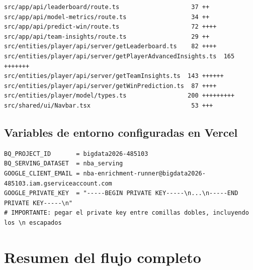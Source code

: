 \documentclass[12pt, letterpaper]{article}
\begin{document}
\begin{lstlisting}[style=outputstyle, caption={Evidencia --- archivos del commit \texttt{ceff8d8} (ultimas APIs y vistas)}]
src/app/api/leaderboard/route.ts                    37 ++
src/app/api/model-metrics/route.ts                  34 ++
src/app/api/predict-win/route.ts                    72 ++++
src/app/api/team-insights/route.ts                  29 ++
src/entities/player/api/server/getLeaderboard.ts    82 ++++
src/entities/player/api/server/getPlayerAdvancedInsights.ts  165 +++++++
src/entities/player/api/server/getTeamInsights.ts  143 ++++++
src/entities/player/api/server/getWinPrediction.ts  87 ++++
src/entities/player/model/types.ts                 200 +++++++++
src/shared/ui/Navbar.tsx                            53 +++
\end{lstlisting}

\subsection{Variables de entorno configuradas en Vercel}

\begin{lstlisting}[style=codestyle, caption={Variables de entorno requeridas en Vercel (Settings -> Environment Variables)}]
BQ_PROJECT_ID       = bigdata2026-485103
BQ_SERVING_DATASET  = nba_serving
GOOGLE_CLIENT_EMAIL = nba-enrichment-runner@bigdata2026-485103.iam.gserviceaccount.com
GOOGLE_PRIVATE_KEY  = "-----BEGIN PRIVATE KEY-----\n...\n-----END PRIVATE KEY-----\n"
# IMPORTANTE: pegar el private key entre comillas dobles, incluyendo los \n escapados
\end{lstlisting}

\section{Resumen del flujo completo}
\end{document}
